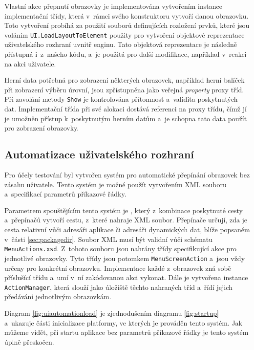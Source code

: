 Vlastní akce přepnutí obrazovky je implementována vytvořením instance implementační třídy, která v~rámci svého konstruktoru vytvoří danou obrazovku. Toto vytvoření probíhá za použití souborů definujících rozložení prvků, které jsou voláním \texttt{UI.LoadLayoutToElement} použity pro vytvoření objektové reprezentace uživatelského rozhraní uvnitř enginu. Tato objektová reprezentace je následně přístupná i~z~našeho kódu, a~je použitá pro další modifikace, například v~reakci na akci uživatele.

Herní data potřebná pro zobrazení některých obrazovek, například herní balíček při zobrazení výběru úrovní, jsou zpřístupněna jako veřejná \textit{property} proxy tříd. Při zavolání metody \texttt{Show} je kontrolována přítomnost a~validita poskytnutých dat. Implementační třída při své alokaci dostává referenci na proxy třídu, čímž jí je umožněn přístup k~poskytnutým herním datům a~je schopna tato data použít pro zobrazení obrazovky.

\subsection{Automatizace uživatelského rozhraní}

Pro účely testování byl vytvořen systém pro automatické přepínání obrazovek bez zásahu uživatele. Tento systém je možné použít vytvořením XML souboru a~specifikací parametrů příkazové řádky.

Parametrem spouštějícím tento systém je , který z~kombinace poskytnuté cesty a~přepínačů  vytvoří cestu, z~které nahraje XML soubor. Přepínače  určují, zda je cesta  relativní vůči adresáři aplikace či adresáři dynamických dat, blíže popsaném v~části \ref{sec:packagedir}. Soubor XML musí být validní vůči schématu \texttt{MenuActions.xsd}. Z~tohoto souboru jsou  nahrány třídy specifikující akce pro jednotlivé obrazovky. Tyto třídy jsou potomkem \texttt{MenuScreenAction} a~jsou vždy určeny pro konkrétní obrazovku. Implementace každé z~obrazovek zná sobě příslušící třídu a~umí v~ní zakódovanou akci vykonat. Dále je vytvořena instance \texttt{ActionManager}, která slouží jako úložiště těchto nahraných tříd a~řídí jejich předávání jednotlivým obrazovkám.

Diagram \ref{fig:uiautomationload} je zjednodušením diagramu \ref{fig:startup} a~ukazuje části inicializace platformy, ve kterých je prováděn tento systém. Jak můžeme vidět, při startu aplikace bez parametrů příkazové řádky je tento systém úplně přeskočen. 

